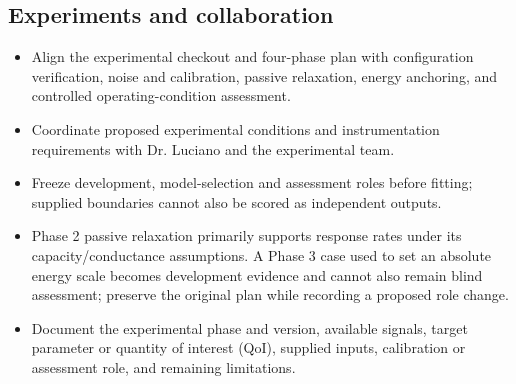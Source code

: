 \subsection{Experiments and collaboration}\label{subsec:experiments-and-collaboration}

\begin{itemize}[leftmargin=*]
\item Align the experimental checkout and four-phase plan with configuration verification, noise and calibration, passive relaxation, energy anchoring, and controlled operating-condition assessment.
\item Coordinate proposed experimental conditions and instrumentation requirements with Dr. Luciano and the experimental team.
\item Freeze development, model-selection and assessment roles before fitting; supplied boundaries cannot also be scored as independent outputs.
\item Phase 2 passive relaxation primarily supports response rates under its capacity/\allowbreak{}conductance assumptions. A Phase 3 case used to set an absolute energy scale becomes development evidence and cannot also remain blind assessment; preserve the original plan while recording a proposed role change.
\item Document the experimental phase and version, available signals, target parameter or quantity of interest (QoI), supplied inputs, calibration or assessment role, and remaining limitations.


\end{itemize}
